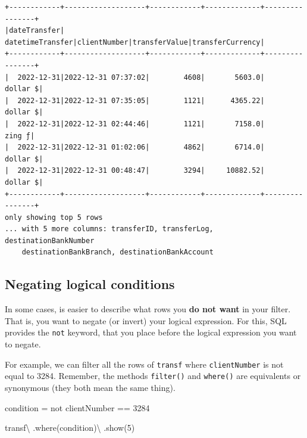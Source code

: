 \documentclass[
  11pt,
  letterpaper,
  DIV=11,
  numbers=noendperiod]{scrreprt}
\newenvironment{Shaded}{\begin{snugshade}}{\end{snugshade}}
\newcommand{\DecValTok}[1]{\textcolor[rgb]{0.68,0.00,0.00}{#1}}
\newcommand{\NormalTok}[1]{\textcolor[rgb]{0.00,0.23,0.31}{#1}}
\newcommand{\OperatorTok}[1]{\textcolor[rgb]{0.37,0.37,0.37}{#1}}
\newcommand{\StringTok}[1]{\textcolor[rgb]{0.13,0.47,0.30}{#1}}
\begin{document}
\begin{verbatim}
+------------+-------------------+------------+-------------+----------------+
|dateTransfer|   datetimeTransfer|clientNumber|transferValue|transferCurrency|
+------------+-------------------+------------+-------------+----------------+
|  2022-12-31|2022-12-31 07:37:02|        4608|       5603.0|        dollar $|
|  2022-12-31|2022-12-31 07:35:05|        1121|      4365.22|        dollar $|
|  2022-12-31|2022-12-31 02:44:46|        1121|       7158.0|          zing ƒ|
|  2022-12-31|2022-12-31 01:02:06|        4862|       6714.0|        dollar $|
|  2022-12-31|2022-12-31 00:48:47|        3294|     10882.52|        dollar $|
+------------+-------------------+------------+-------------+----------------+
only showing top 5 rows
... with 5 more columns: transferID, transferLog, destinationBankNumber
    destinationBankBranch, destinationBankAccount
\end{verbatim}

\hypertarget{negating-logical-conditions}{%
\subsection{Negating logical
conditions}\label{negating-logical-conditions}}

In some cases, is easier to describe what rows you \textbf{do not want}
in your filter. That is, you want to negate (or invert) your logical
expression. For this, SQL provides the \texttt{not} keyword, that you
place before the logical expression you want to negate.

For example, we can filter all the rows of \texttt{transf} where
\texttt{clientNumber} is not equal to 3284. Remember, the methods
\texttt{filter()} and \texttt{where()} are equivalents or synonymous
(they both mean the same thing).

\begin{Shaded}
\begin{Highlighting}[]
\NormalTok{condition }\OperatorTok{=} \StringTok{\textquotesingle{}\textquotesingle{}\textquotesingle{}}
\StringTok{  not clientNumber == 3284}
\StringTok{\textquotesingle{}\textquotesingle{}\textquotesingle{}}

\NormalTok{transf}\OperatorTok{\textbackslash{}}
\NormalTok{  .where(condition)}\OperatorTok{\textbackslash{}}
\NormalTok{  .show(}\DecValTok{5}\NormalTok{)}
\end{Highlighting}
\end{Shaded}
\end{document}
